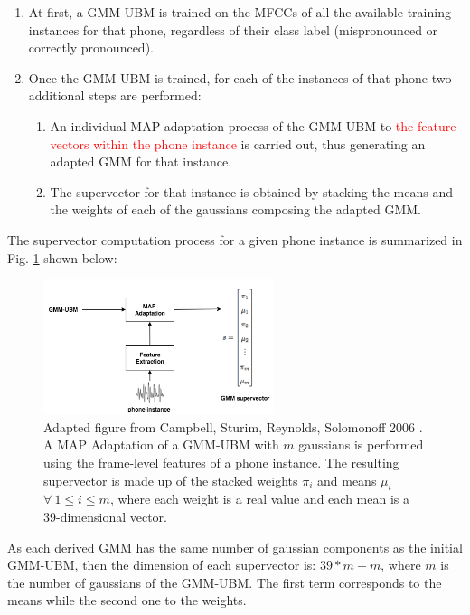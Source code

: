 \begin{enumerate}
  \item At first, a GMM-UBM is trained on the MFCCs
  of all the available training instances for that phone, regardless of their class
  label (mispronounced or correctly pronounced).
  \item Once the GMM-UBM is trained, for each of the instances of
  that phone two additional steps are performed:
    \begin{enumerate}
      \item An individual MAP adaptation process of the GMM-UBM to
      \textcolor{red}{the feature vectors within the phone instance}
      is carried out, thus generating an adapted GMM for that instance.
      \item The supervector for that instance
      is obtained by stacking the means and the weights of each of the
      gaussians composing the adapted GMM.
    \end{enumerate}
\end{enumerate}

The supervector computation process for a given phone instance
is summarized in Fig. \ref{fig:supervectors_extraction} shown below:

\begin{figure}[H]
  \centering
  \includegraphics[width=0.6\textwidth]{files/figures/method/supervectors_extraction}
  \caption{
    Adapted figure from Campbell, Sturim, Reynolds, Solomonoff 2006 \cite{supervectors}.
    A MAP Adaptation of a GMM-UBM with $m$ gaussians
    is performed using the frame-level features of a phone instance.
    The resulting supervector is made up of the stacked weights $\pi_{i}$ and means
    $\mu_{i}$ $\forall \ 1 \leq i \leq m$, where each weight is a real value and each
    mean is a 39-dimensional vector.
  }
  \label{fig:supervectors_extraction}
\end{figure}

As each derived GMM has the same number of gaussian components as the initial GMM-UBM,
then the dimension
of each supervector is: $39*m + m$, where $m$ is the number of gaussians of the GMM-UBM. The
first term corresponds to the means while the second one to the weights.

